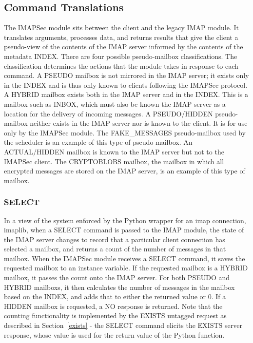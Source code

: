 \documentclass[pageno]{jpaper}
\newcommand{\project}{IMAPSec }
\begin{document}
\subsection{Command Translations}
The \project module sits between the client and the legacy IMAP module. It translates arguments, processes data, and returns results that give the client a pseudo-view of the contents of the IMAP server informed by the contents of the metadata INDEX. There are four possible pseudo-mailbox classifications. The classification determines the actions that the module takes in response to each command. A PSEUDO mailbox is not mirrored in the IMAP server; it exists only in the INDEX and is thus only known to clients following the \project protocol. A HYBRID mailbox exists both in the IMAP server and in the INDEX. This is a mailbox such as INBOX, which must also be known the IMAP server as a location for the delivery of incoming messages. A PSEUDO/HIDDEN pseudo-mailbox neither exists in the IMAP server nor is known to the client. It is for use only by the \project module. The FAKE\_MESSAGES pseudo-mailbox used by the scheduler is an example of this type of pseudo-mailbox. An ACTUAL/HIDDEN mailbox is known to the IMAP server but not to the \project client. The CRYPTOBLOBS mailbox, the mailbox in which all encrypted messages are stored on the IMAP server, is an example of this type of mailbox. 

\label{select}
\subsubsection{SELECT} In a view of the system enforced by the Python wrapper for an imap connection, imaplib, when a SELECT command is passed to the IMAP module, the state of the IMAP server changes to record that a particular client connection has selected a mailbox, and returns a count of the number of messages in that mailbox. When the \project module receives a SELECT command, it saves the requested mailbox to an instance variable. If the requested mailbox is a HYBRID mailbox, it passes the count onto the IMAP server. For both PSEUDO and HYBRID mailboxs, it then calculates the number of messages in the mailbox based on the INDEX, and adds that to either the returned value or 0. If a HIDDEN mailbox is requested, a NO response is returned. Note that the counting functionality is implemented by the EXISTS untagged request as described in Section~\ref{exists} - the SELECT command elicits the EXISTS server response, whose value is used for the return value of the Python function.
\end{document}
